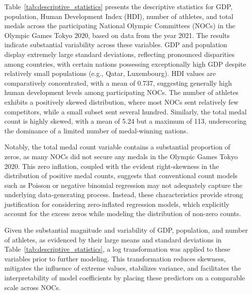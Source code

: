\documentclass[11pt,twoside]{article}
\numberwithin{Theorem}{section}
\numberwithin{Definition}{section}
\numberwithin{Lemma}{section}
\numberwithin{Algorithm}{section}
\numberwithin{equation}{section}
\begin{document}
Table~\ref{tab:descriptive_statistics} presents the descriptive statistics for GDP, population, Human Development Index (HDI), number of athletes, and total medals across the participating National Olympic Committees (NOCs) in the Olympic Games Tokyo 2020, based on data from the year 2021. The results indicate substantial variability across these variables. GDP and population display extremely large standard deviations, reflecting pronounced disparities among countries, with certain nations possessing exceptionally high GDP despite relatively small populations (e.g., Qatar, Luxembourg). HDI values are comparatively concentrated, with a mean of 0.737, suggesting generally high human development levels among participating NOCs. The number of athletes exhibits a positively skewed distribution, where most NOCs sent relatively few competitors, while a small subset sent several hundred. Similarly, the total medal count is highly skewed, with a mean of 5.24 but a maximum of 113, underscoring the dominance of a limited number of medal-winning nations.

Notably, the total medal count variable contains a substantial proportion of zeros, as many NOCs did not secure any medals in the Olympic Games Tokyo 2020. This zero inflation, coupled with the evident right-skewness in the distribution of positive medal counts, suggests that conventional count models such as Poisson or negative binomial regression may not adequately capture the underlying data-generating process. Instead, these characteristics provide strong justification for considering zero-inflated regression models, which explicitly account for the excess zeros while modeling the distribution of non-zero counts.

Given the substantial magnitude and variability of GDP, population, and number of athletes, as evidenced by their large means and standard deviations in Table~\ref{tab:descriptive_statistics}, a log transformation was applied to these variables prior to further modeling. This transformation reduces skewness, mitigates the influence of extreme values, stabilizes variance, and facilitates the interpretability of model coefficients by placing these predictors on a comparable scale across NOCs.
\end{document}
